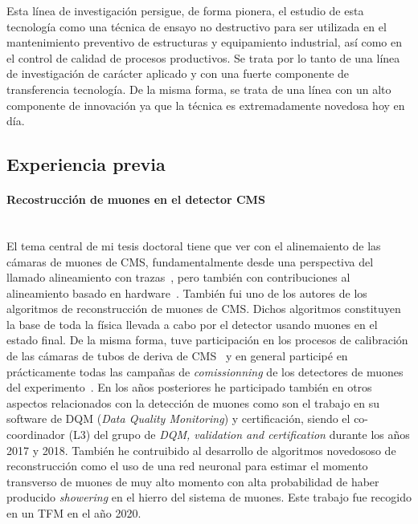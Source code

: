 Esta línea de investigación persigue, de forma pionera, el estudio de esta tecnología como una técnica de ensayo no destructivo para ser utilizada en el mantenimiento preventivo de estructuras y equipamiento industrial, así como en el control de calidad de procesos productivos. Se trata por lo tanto de una línea de investigación de carácter aplicado y con una fuerte componente de transferencia tecnología. De la misma forma, se trata de una línea con un alto componente de innovación ya que la técnica es extremadamente novedosa hoy en día.   

\subsection{Experiencia previa}

\paragraph{Recostrucción de muones en el detector CMS\\\\}

El tema central de mi tesis doctoral tiene que ver con el alinemaiento de las cámaras de muones de CMS, fundamentalmente desde una perspectiva del llamado alineamiento con trazas~\cite{bib:trackbased}, pero también con contribuciones al alineamiento basado en hardware~\cite{bib:hardware1,bib:hardware2}. También fui uno de los autores de los algoritmos de reconstrucción de muones de CMS. Dichos algoritmos constituyen la base de toda la física llevada a cabo por el detector usando muones en el estado final. De la misma forma, tuve participación en los procesos de calibración de las cámaras de tubos de deriva de CMS~\cite{bib:DT1,bib:DT2,bib:DT3} y en general participé en prácticamente todas las campañas de \emph{comissionning} de los detectores de muones del experimento~\cite{bib:workflows,bib:comm,bib:mag,bib:muonreco}. En los años posteriores he participado también en otros aspectos relacionados con la detección de muones como son el trabajo en su software de DQM (\emph{Data Quality Monitoring}) y certificación, siendo el co-coordinador (L3) del grupo de \emph{DQM, validation and certification} durante los años 2017 y 2018. También he contruibido al desarrollo de algoritmos novedososo de reconstrucción como el uso de una red neuronal para estimar el momento transverso de muones de muy alto momento con alta probabilidad de haber producido \emph{showering} en el hierro del sistema de muones. Este trabajo fue recogido en un TFM en el año 2020. 


